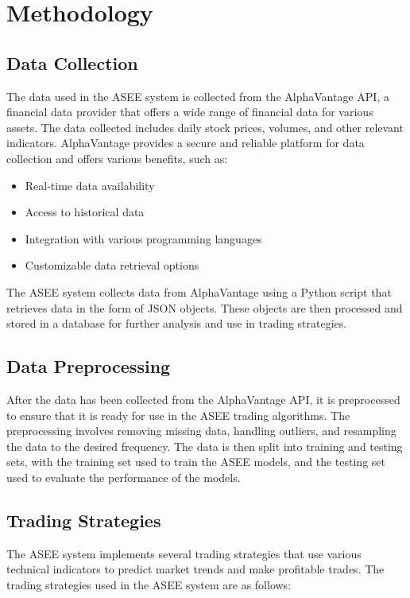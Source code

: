 
\chapter{Methodology}

\label{Chapter3} %

\section{Data Collection}
The data used in the ASEE system is collected from the AlphaVantage API, a financial data provider that offers a wide range of financial data for various assets. The data collected includes daily stock prices, volumes, and other relevant indicators. AlphaVantage provides a secure and reliable platform for data collection and offers various benefits, such as:

\begin{itemize}
\item Real-time data availability
\item Access to historical data
\item Integration with various programming languages
\item Customizable data retrieval options
\end{itemize}

The ASEE system collects data from AlphaVantage using a Python script that retrieves data in the form of JSON objects. These objects are then processed and stored in a database for further analysis and use in trading strategies.

\section{Data Preprocessing}
After the data has been collected from the AlphaVantage API, it is preprocessed to ensure that it is ready for use in the ASEE trading algorithms. The preprocessing involves removing missing data, handling outliers, and resampling the data to the desired frequency. The data is then split into training and testing sets, with the training set used to train the ASEE models, and the testing set used to evaluate the performance of the models.

\section{Trading Strategies}
The ASEE system implements several trading strategies that use various technical indicators to predict market trends and make profitable trades. The trading strategies used in the ASEE system are as follows:

